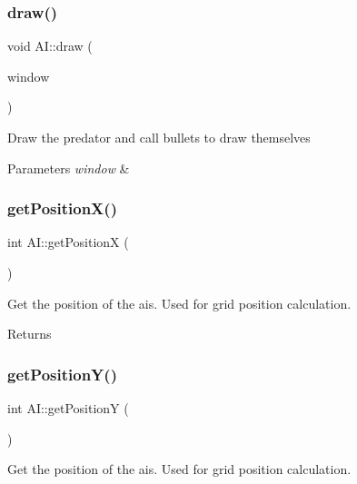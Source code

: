 \subsubsection{\texorpdfstring{draw()}{draw()}}
{\footnotesize\ttfamily void A\+I\+::draw (\begin{DoxyParamCaption}\item[{sf\+::\+Render\+Window \&}]{window }\end{DoxyParamCaption})}



Draw the predator and call bullets to draw themselves 


\begin{DoxyParams}{Parameters}
{\em window} & \\
\hline
\end{DoxyParams}
\mbox{\label{class_a_i_ac91b130c717b028b2b712a6b9b29c32f}} 
\subsubsection{\texorpdfstring{getPositionX()}{getPositionX()}}
{\footnotesize\ttfamily int A\+I\+::get\+PositionX (\begin{DoxyParamCaption}{ }\end{DoxyParamCaption})}



Get the position of the ais. Used for grid position calculation. 

\begin{DoxyReturn}{Returns}

\end{DoxyReturn}
\mbox{\label{class_a_i_a3f54bcc3e90cfc46fefd0389c506720b}} 
\subsubsection{\texorpdfstring{getPositionY()}{getPositionY()}}
{\footnotesize\ttfamily int A\+I\+::get\+PositionY (\begin{DoxyParamCaption}{ }\end{DoxyParamCaption})}



Get the position of the ais. Used for grid position calculation. 

